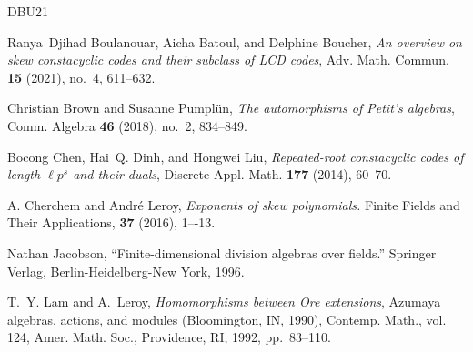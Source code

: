 \documentclass[11pt]{amsart}
\theoremstyle{plain}
\theoremstyle{definition}
\numberwithin{equation}{section}
\numberwithin{figure}{section}
\begin{document}
\begin{thebibliography}{DBU{\etalchar{+}}21}

Ranya~Djihad Boulanouar, Aicha Batoul, and Delphine Boucher, \emph{An overview on skew constacyclic codes and their subclass of {LCD} codes}, Adv. Math. Commun. \textbf{15} (2021), no.~4, 611--632. 


Christian Brown and Susanne Pumpl\"un, \emph{The automorphisms of {P}etit's algebras}, Comm. Algebra \textbf{46} (2018), no.~2, 834--849. 


Bocong Chen, Hai~Q. Dinh, and Hongwei Liu, \emph{Repeated-root constacyclic codes of length {$\ell p^s$} and their duals}, Discrete Appl. Math. \textbf{177} (2014), 60--70. 

 A. Cherchem and Andr\'e Leroy, \emph{Exponents of skew polynomials.} Finite Fields and Their Applications,
\textbf{37} (2016), 1–-13. 


 Nathan Jacobson, ``Finite-dimensional division algebras over fields.'' Springer
Verlag, Berlin-Heidelberg-New York, 1996.

T.~Y. Lam and A.~Leroy, \emph{Homomorphisms between {O}re extensions}, Azumaya algebras, actions, and modules ({B}loomington, {IN}, 1990), Contemp. Math., vol. 124, Amer. Math. Soc., Providence, RI, 1992, pp.~83--110. 


\end{thebibliography}
\end{document}
